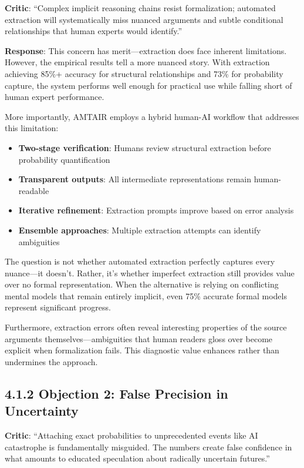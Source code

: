 \documentclass[
  11pt,
  letterpaper,
]{book}
\providecommand{\tightlist}{%
  \setlength{\itemsep}{0pt}\setlength{\parskip}{0pt}}
\begin{document}
\textbf{Critic}: ``Complex implicit reasoning chains resist
formalization; automated extraction will systematically miss nuanced
arguments and subtle conditional relationships that human experts would
identify.''

\textbf{Response}: This concern has merit---extraction does face
inherent limitations. However, the empirical results tell a more nuanced
story. With extraction achieving 85\%+ accuracy for structural
relationships and 73\% for probability capture, the system performs well
enough for practical use while falling short of human expert
performance.

More importantly, AMTAIR employs a hybrid human-AI workflow that
addresses this limitation:

\begin{itemize}
\tightlist
\item
  \textbf{Two-stage verification}: Humans review structural extraction
  before probability quantification
\item
  \textbf{Transparent outputs}: All intermediate representations remain
  human-readable\\
\item
  \textbf{Iterative refinement}: Extraction prompts improve based on
  error analysis
\item
  \textbf{Ensemble approaches}: Multiple extraction attempts can
  identify ambiguities
\end{itemize}

The question is not whether automated extraction perfectly captures
every nuance---it doesn't. Rather, it's whether imperfect extraction
still provides value over no formal representation. When the alternative
is relying on conflicting mental models that remain entirely implicit,
even 75\% accurate formal models represent significant progress.

Furthermore, extraction errors often reveal interesting properties of
the source arguments themselves---ambiguities that human readers gloss
over become explicit when formalization fails. This diagnostic value
enhances rather than undermines the approach.

\subsection*{4.1.2 Objection 2: False Precision in
Uncertainty}\label{sec-false-precision}

\textbf{Critic}: ``Attaching exact probabilities to unprecedented events
like AI catastrophe is fundamentally misguided. The numbers create false
confidence in what amounts to educated speculation about radically
uncertain futures.''
\end{document}
